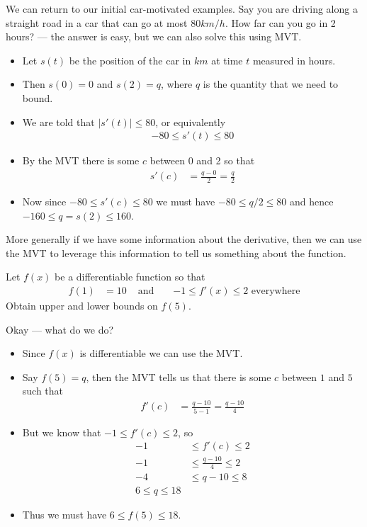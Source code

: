 \begin{eg}
We can return to our initial car-motivated examples. Say you are driving along a straight
road in a car that can go at most $80km/h$. How far can you go in 2 hours? --- the answer
is easy, but we can also solve this using MVT.
\begin{itemize}
 \item Let $s(t)$ be the position of the car in $km$ at time $t$ measured in hours.
\item Then $s(0)=0$ and $s(2)=q$, where $q$ is the quantity that we need to bound.
\item We are told that $| s'(t) | \leq 80$, or equivalently
\begin{align*}
-80 \leq s'(t) \leq 80
\end{align*}
\item By the MVT there is some $c$ between 0 and 2 so that
\begin{align*}
  s'(c) &= \frac{q-0}{2} = \frac{q}{2}
\end{align*}
\item Now since $-80 \leq s'(c) \leq 80$ we must have $-80 \leq q/2 \leq 80$ and hence
$-160 \leq q=s(2) \leq 160$.
\end{itemize}
\end{eg}
More generally if we have some information about the derivative, then we can use the
MVT to leverage this information to tell us something about the function.
\begin{eg}
Let $f(x)$ be a differentiable function so that
\begin{align*}
  f(1)&=10 &\text{ and }&& -1 \leq f'(x) \leq 2 \text{ everywhere}
\end{align*}
Obtain upper and lower bounds on $f(5)$.


Okay --- what do we do?
\begin{itemize}
 \item Since $f(x)$ is differentiable we can use the MVT.
 \item Say $f(5)=q$, then the MVT tells us that there is some $c$ between $1$ and $5$ such
  that
\begin{align*}
 f'(c) &=\frac{q-10}{5-1} = \frac{q-10}{4}
\end{align*}
\item But we know that $-1 \leq f'(c) \leq 2$, so
\begin{align*}
-1 &\leq f'(c) \leq 2 \\
-1 & \leq \frac{q-10}{4} \leq 2 \\
  -4 & \leq q-10 \leq 8 \\
  6 \leq q \leq 18
\end{align*}
\item Thus we must have $6 \leq f(5) \leq 18$.
\end{itemize}
\end{eg}

